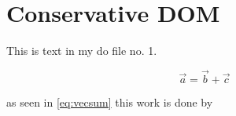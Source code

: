 %

\section{Conservative DOM}
\label{ch:CDOM}

This is text in my do file no. 1.


\begin{equation}
	\vec{a} = \vec{b}+\vec{c}
\label{eq:vecsum}
\end{equation}

as seen in \ref{eq:vecsum} this work is done by \cite{Huang2011261}

%
%

%
